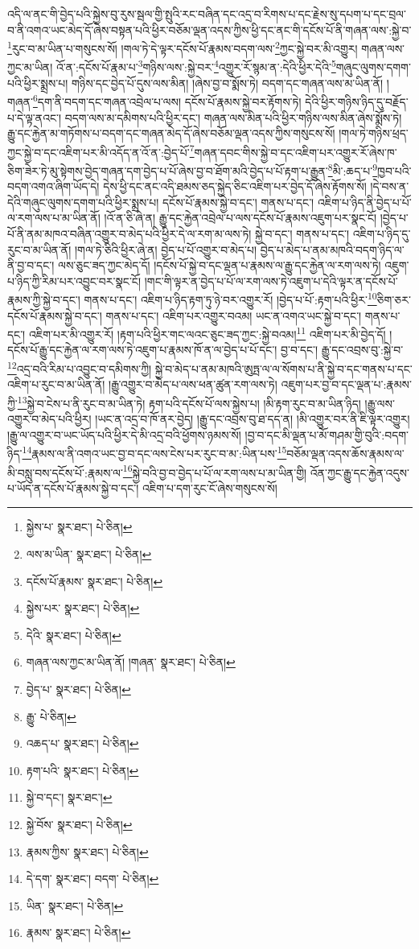 འདི་ལ་ནང་གི་བྱེད་པའི་སྐྱེས་བུ་རུས་སྦལ་གྱི་སྤུའི་རང་བཞིན་དང་འདྲ་བ་རིགས་པ་དང་རྗེས་སུ་དཔག་པ་དང་བྲལ་བ་ནི་འགའ་ཡང་མེད་དོ་ཞེས་བསྟན་པའི་ཕྱིར་བཅོམ་ལྡན་འདས་ཀྱིས་ཕྱི་དང་ནང་གི་དངོས་པོ་ནི་གཞན་ལས་:སྐྱེ་བ་\footnote{སྐྱེས་པ་  སྣར་ཐང་།  པེ་ཅིན། }རུང་བ་མ་ཡིན་པ་གསུངས་སོ། །གལ་ཏེ་དེ་ལྟར་དངོས་པོ་རྣམས་བདག་ལས་\footnote{ལས་མ་ཡིན་  སྣར་ཐང་།  པེ་ཅིན། }ཀྱང་སྐྱེ་བར་མི་འགྱུར། གཞན་ལས་ཀྱང་མ་ཡིན། འོ་ན་:དངོས་པོ་རྣམ་པ་\footnote{དངོས་པོ་རྣམས་  སྣར་ཐང་།  པེ་ཅིན། }གཉིས་ལས་:སྐྱེ་བར་\footnote{སྐྱེས་པར་  སྣར་ཐང་།  པེ་ཅིན། }འགྱུར་རོ་སྙམ་ན་:དེའི་ཕྱིར་དེའི་\footnote{དེའི་  སྣར་ཐང་།  པེ་ཅིན། }གཞུང་ལུགས་དགག་པའི་ཕྱིར་སྨྲས་པ། གཉིས་དང་བྱེད་པོ་དུས་ལས་མིན། །ཞེས་བྱ་བ་སྨོས་ཏེ། བདག་དང་གཞན་ལས་མ་ཡིན་ནོ། །གཞན་\footnote{གཞན་ལས་ཀྱང་མ་ཡིན་ནོ། །གཞན་  སྣར་ཐང་།  པེ་ཅིན། }དག་ནི་བདག་དང་གཞན་འབྲེལ་པ་ལས། དངོས་པོ་རྣམས་སྐྱེ་བར་རྟོགས་ཏེ། དེའི་ཕྱིར་གཉིས་ཉིད་དུ་བརྗོད་པ་དེ་ལྟ་ནའང་། བདག་ལས་མ་དམིགས་པའི་ཕྱིར་དང་། གཞན་ལས་མིན་པའི་ཕྱིར་གཉིས་ལས་མིན་ཞེས་སྨོས་ཏེ། རྒྱུ་དང་རྐྱེན་མ་གཏོགས་པ་བདག་དང་གཞན་མེད་དོ་ཞེས་བཅོམ་ལྡན་འདས་ཀྱིས་གསུངས་སོ། །གལ་ཏེ་གཉིས་ཕྲད་ཀྱང་སྐྱེ་བ་དང་འཇིག་པར་མི་འདོད་ན་འོ་ན་:བྱེད་པོ་\footnote{བྱེད་པ་  སྣར་ཐང་།  པེ་ཅིན། }གཞན་དབང་གིས་སྐྱེ་བ་དང་འཇིག་པར་འགྱུར་རོ་ཞེས་ཁ་ཅིག་ཟེར་ཏེ་མུ་སྟེགས་བྱེད་གཞན་དག་བྱེད་པ་པོ་ཞེས་བྱ་བ་ཐོག་མའི་བྱེད་པ་པོ་རྟག་པ་རྒྱུན་\footnote{རྒྱུ་  པེ་ཅིན། }མི་:ཆད་པ་\footnote{འཆད་པ་  སྣར་ཐང་།  པེ་ཅིན། }ཁྱབ་པའི་བདག་འགའ་ཞིག་ཡོད་དེ། དེས་ཕྱི་དང་ནང་འདི་ཐམས་ཅད་སྐྱེད་ཅིང་འཇིག་པར་བྱེད་དོ་ཞེས་རྟོགས་སོ། །དེ་བས་ན་དེའི་གཞུང་ལུགས་དགག་པའི་ཕྱིར་སྨྲས་པ། དངོས་པོ་རྣམས་སྐྱེ་བ་དང་། གནས་པ་དང་། འཇིག་པ་ཉིད་ནི་བྱེད་པ་པོ་ལ་རག་ལས་པ་མ་ཡིན་ནོ། །འོ་ན་ཅི་ཞེ་ན། རྒྱུ་དང་རྐྱེན་འབྲེལ་པ་ལས་དངོས་པོ་རྣམས་འཇུག་པར་སྣང་ངོ། །བྱེད་པ་པོ་ནི་ནམ་མཁའ་བཞིན་འགྱུར་བ་མེད་པའི་ཕྱིར་དེ་ལ་རག་མ་ལས་ཏེ། སྐྱེ་བ་དང་། གནས་པ་དང་། འཇིག་པ་ཉིད་དུ་རུང་བ་མ་ཡིན་ནོ། །གལ་ཏེ་ཅིའི་ཕྱིར་ཞེ་ན། བྱེད་པ་པོ་འགྱུར་བ་མེད་པ། བྱེད་པ་མེད་པ་ནམ་མཁའི་བདག་ཉིད་ལ་ནི་བྱ་བ་དང་། ལས་ཅུང་ཟད་ཀྱང་མེད་དོ། །དངོས་པོ་སྐྱེ་བ་དང་ལྡན་པ་རྣམས་ལ་རྒྱུ་དང་རྐྱེན་ལ་རག་ལས་ཏེ། འཇུག་པ་ཉིད་ཀྱི་རིམ་པར་འབྱུང་བར་སྣང་ངོ། །གང་གི་ལྟར་ན་བྱེད་པ་པོ་ལ་རག་ལས་ཏེ་འཇུག་པ་དེའི་ལྟར་ན་དངོས་པོ་རྣམས་ཀྱི་སྐྱེ་བ་དང་། གནས་པ་དང་། འཇིག་པ་ཉིད་རྟག་ཏུ་ཉེ་བར་འགྱུར་རོ། །བྱེད་པ་པོ་:རྟག་པའི་ཕྱིར་\footnote{རྟག་པའི་  སྣར་ཐང་།  པེ་ཅིན། }ཅིག་ཅར་དངོས་པོ་རྣམས་སྐྱེ་བ་དང་། གནས་པ་དང་། འཇིག་པར་འགྱུར་བའམ། ཡང་ན་འགའ་ཡང་སྐྱེ་བ་དང་། གནས་པ་དང་། འཇིག་པར་མི་འགྱུར་རོ། །རྟག་པའི་ཕྱིར་གང་ལའང་ཅུང་ཟད་ཀྱང་:སྐྱེ་བའམ།\footnote{སྐྱེ་བ་དང་།  སྣར་ཐང་། } འཇིག་པར་མི་བྱེད་དོ། །དངོས་པོ་རྒྱུ་དང་རྐྱེན་ལ་རག་ལས་ཏེ་འཇུག་པ་རྣམས་ཁོ་ན་ལ་བྱེད་པ་པོ་དང་། བྱ་བ་དང་། རྒྱུ་དང་འབྲས་བུ་:སྐྱེ་བ་\footnote{སྐྱེ་བོས་  སྣར་ཐང་།  པེ་ཅིན། }འདྲ་བའི་རིམ་པ་འབྱུང་བ་དམིགས་ཀྱི། སྐྱེ་བ་མེད་པ་ནམ་མཁའི་ཨུཏྤ་ལ་ལ་སོགས་པ་ནི་སྐྱེ་བ་དང་གནས་པ་དང་འཇིག་པ་རུང་བ་མ་ཡིན་ནོ། །རྒྱུ་འགྱུར་བ་མེད་པ་ལས་ཕན་ཚུན་རག་ལས་ཏེ། འཇུག་པར་བྱ་བ་དང་ལྡན་པ་:རྣམས་ཀྱི་\footnote{རྣམས་ཀྱིས་  སྣར་ཐང་།  པེ་ཅིན། }སྐྱེ་བ་ངེས་པ་ནི་རུང་བ་མ་ཡིན་ཏེ། རྟག་པའི་དངོས་པོ་ལས་སྐྱེས་པ། །མི་རྟག་རུང་བ་མ་ཡིན་ཉིད། །རྒྱུ་ལས་འགྱུར་བ་མེད་པའི་ཕྱིར། །ཡང་ན་འདྲ་བ་ཁོ་ནར་བྱེད། །རྒྱུ་དང་འབྲས་བུ་ཐ་དད་ན། །མི་འགྱུར་བར་ནི་ཇི་ལྟར་འགྱུར། །རྒྱུ་ལ་འགྱུར་བ་ཡང་ཡོད་པའི་ཕྱིར་དེ་མི་འདྲ་བའི་ཕྱོགས་ཉམས་སོ། །བྱ་བ་དང་མི་ལྡན་པ་མོ་གཤམ་གྱི་བུའི་:བདག་ཉིད་\footnote{དེ་དག་  སྣར་ཐང་། བདག་  པེ་ཅིན། }རྣམས་ལ་ནི་འགའ་ཡང་བྱ་བ་དང་ལས་ངེས་པར་རུང་བ་མ་:ཡིན་པས་\footnote{ཡིན་  སྣར་ཐང་།  པེ་ཅིན། }བཅོམ་ལྡན་འདས་ཆོས་རྣམས་ལ་མི་བསླུ་བས་དངོས་པོ་:རྣམས་ལ་\footnote{རྣམས་  སྣར་ཐང་།  པེ་ཅིན། }སྐྱེ་བའི་བྱ་བ་བྱེད་པ་པོ་ལ་རག་ལས་པ་མ་ཡིན་གྱི། འོན་ཀྱང་རྒྱུ་དང་རྐྱེན་འདུས་པ་ཡོད་ན་དངོས་པོ་རྣམས་སྐྱེ་བ་དང་། འཇིག་པ་དག་རུང་ངོ་ཞེས་གསུངས་སོ། 